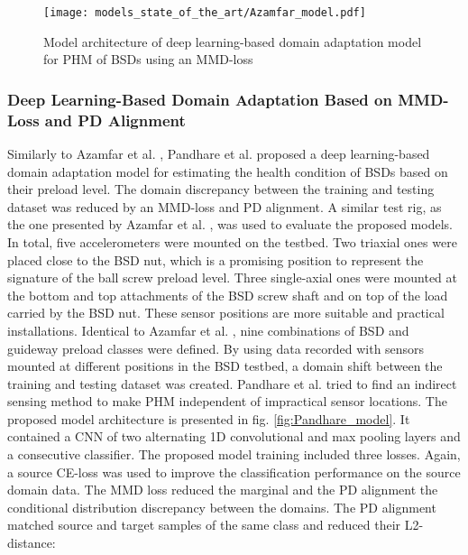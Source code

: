 \begin{figure}[H]
  \centering
  \texttt{[image: models\_state\_of\_the\_art/Azamfar\_model.pdf]}
  \caption{Model architecture of deep learning-based domain adaptation model for PHM of BSDs using an MMD-loss \cite{AZAMFAR2020103932}}
  \label{fig:Azamfar_model}
\end{figure}


\subsubsection{Deep Learning-Based Domain Adaptation Based on MMD-Loss and PD Alignment}
Similarly to Azamfar et al. \cite{AZAMFAR2020103932}, Pandhare et al. \cite{Pandhare2021} proposed a deep learning-based domain adaptation model for estimating the health condition of BSDs based on their preload level. The domain discrepancy between the training and testing dataset was reduced by an MMD-loss and PD alignment. A similar test rig, as the one presented by Azamfar et al. \cite{AZAMFAR2020103932}, was used to evaluate the proposed models. In total, five accelerometers were mounted on the testbed. Two triaxial ones were placed close to the BSD nut, which is a promising position to represent the signature of the ball screw preload level. Three single-axial ones were mounted at the bottom and top attachments of the BSD screw shaft and on top of the load carried by the BSD nut. These sensor positions are more suitable and practical installations. Identical to Azamfar et al. \cite{AZAMFAR2020103932}, nine combinations of BSD and guideway preload classes were defined. By using data recorded with sensors mounted at different positions in the BSD testbed, a domain shift between the training and testing dataset was created. Pandhare et al. \cite{Pandhare2021} tried to find an indirect sensing method to make PHM independent of impractical sensor locations. The proposed model architecture is presented in fig. \ref{fig:Pandhare_model}. It contained a CNN of two alternating 1D convolutional and max pooling layers and a consecutive classifier. The proposed model training included three losses. Again, a source CE-loss was used to improve the classification performance on the source domain data. The MMD loss reduced the marginal and the PD alignment the conditional distribution discrepancy between the domains. The PD alignment matched source and target samples of the same class and reduced their L2-distance: 

